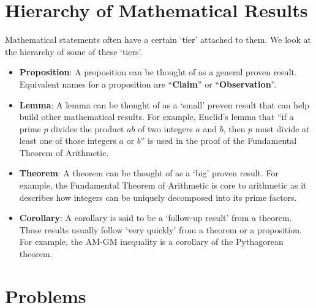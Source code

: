 \section{Hierarchy of Mathematical Results}
Mathematical statements often have a certain `tier' attached to them. We look at the hierarchy of some of these `tiers'.
\begin{itemize}
    \item \textbf{Proposition}: A proposition can be thought of as a general proven result. Equivalent names for a proposition are ``\textbf{Claim}'' or ``\textbf{Observation}''.
    \item \textbf{Lemma}: A lemma can be thought of as a `small' proven result that can help build other mathematical results. For example, Euclid's lemma that ``if a prime $p$ divides the product $ab$ of two integers $a$ and $b$, then $p$ must divide at least one of those integers $a$ or $b$'' is used in the proof of the Fundamental Theorem of Arithmetic.
    \item \textbf{Theorem}: A theorem can be thought of as a `big' proven result. For example, the Fundamental Theorem of Arithmetic is core to arithmetic as it describes how integers can be uniquely decomposed into its prime factors.
    \item \textbf{Corollary}: A corollary is said to be a `follow-up result' from a theorem. These results usually follow `very quickly' from a theorem or a proposition. For example, the AM-GM inequality is a corollary of the Pythagorean theorem.
\end{itemize}

\newpage

\section{Problems}
